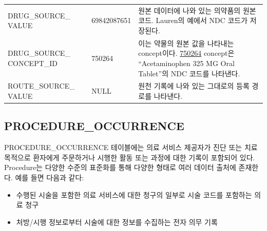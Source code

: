 \documentclass[10.5pt]{book}
\providecommand{\tightlist}{%
  \setlength{\itemsep}{0pt}\setlength{\parskip}{0pt}}
\theoremstyle{definition}
\theoremstyle{definition}
\theoremstyle{definition}
\theoremstyle{remark}
\begin{document}
\begin{longtable}[]{@{}lll@{}}
\begin{minipage}[t]{0.28\columnwidth}\raggedright\strut
DRUG\_SOURCE\_ VALUE\strut
\end{minipage} & \begin{minipage}[t]{0.16\columnwidth}\raggedright\strut
69842087651\strut
\end{minipage} & \begin{minipage}[t]{0.48\columnwidth}\raggedright\strut
원본 데이터에 나와 있는 의약품의 원본 코드. Lauren의 예에서 NDC 코드가
저장된다.\strut
\end{minipage}\tabularnewline
\begin{minipage}[t]{0.28\columnwidth}\raggedright\strut
DRUG\_SOURCE\_ CONCEPT\_ID\strut
\end{minipage} & \begin{minipage}[t]{0.16\columnwidth}\raggedright\strut
750264\strut
\end{minipage} & \begin{minipage}[t]{0.48\columnwidth}\raggedright\strut
이는 약물의 원본 값을 나타내는 concept이다.
\href{http://athena.ohdsi.org/search-terms/terms/750264}{750264}
concept은 ``Acetaminophen 325 MG Oral Tablet''의 NDC 코드를
나타낸다.\strut
\end{minipage}\tabularnewline
\begin{minipage}[t]{0.28\columnwidth}\raggedright\strut
ROUTE\_SOURCE\_ VALUE\strut
\end{minipage} & \begin{minipage}[t]{0.16\columnwidth}\raggedright\strut
NULL\strut
\end{minipage} & \begin{minipage}[t]{0.48\columnwidth}\raggedright\strut
원천 기록에 나와 있는 그대로의 등록 경로를 나타낸다.\strut
\end{minipage}\tabularnewline
\bottomrule
\end{longtable}

\subsection{PROCEDURE\_OCCURRENCE}\label{procedureOccurrence}

PROCEDURE\_OCCURRENCE 테이블에는 의료 서비스 제공자가 진단 또는 치료
목적으로 환자에게 주문하거나 시행한 활동 또는 과정에 대한 기록이
포함되어 있다. Procedure는 다양한 수준의 표준화를 통해 다양한 형태로
여러 데이터 출처에 존재한다. 예를 들면 다음과 같다:

\begin{itemize}
\tightlist
\item
  수행된 시술을 포함한 의료 서비스에 대한 청구의 일부로 시술 코드를
  포함하는 의료 청구
\item
  처방/시행 정보로부터 시술에 대한 정보를 수집하는 전자 의무 기록
\end{itemize}
\end{document}
